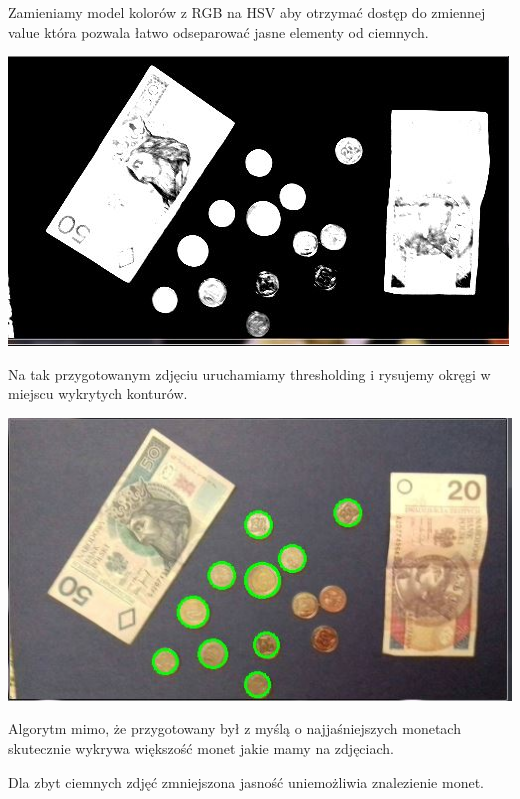 \documentclass[12pt]{article}
\begin{document}
Zamieniamy model kolorów z RGB na HSV aby otrzymać dostęp do zmiennej value która pozwala łatwo odseparować jasne elementy od ciemnych.

\includegraphics[scale=0.4]{BrightV}

Na tak przygotowanym zdjęciu uruchamiamy thresholding i rysujemy okręgi w miejscu wykrytych konturów.

\includegraphics[scale=0.4]{BrightR}

Algorytm mimo, że przygotowany był z myślą o najjaśniejszych monetach skutecznie wykrywa większość monet jakie mamy na zdjęciach.

Dla zbyt ciemnych zdjęć zmniejszona jasność uniemożliwia znalezienie monet.
\end{document}
